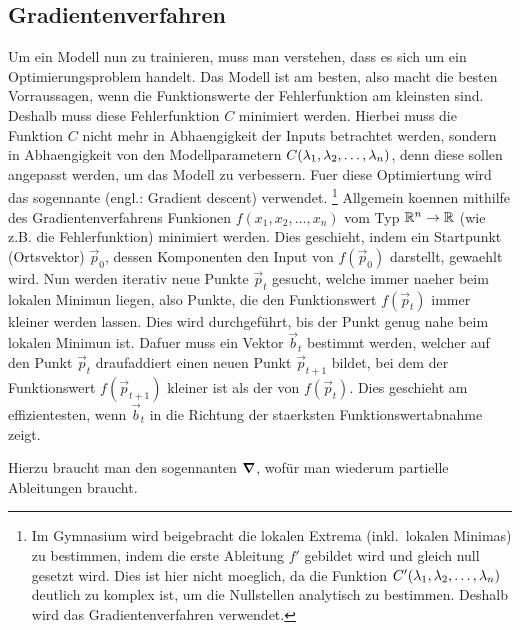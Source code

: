 \subsection{Gradientenverfahren}\label{sec:gradientenverfahren}
Um ein Modell nun zu trainieren, muss man verstehen, dass es sich um ein Optimierungsproblem handelt.
Das Modell ist am besten, also macht die besten Vorraussagen, wenn die
Funktionswerte der Fehlerfunktion am kleinsten sind.
Deshalb muss diese Fehlerfunktion $C$ minimiert werden.
Hierbei muss die Funktion $C$ nicht mehr in Abhaengigkeit der Inputs betrachtet werden, sondern in Abhaengigkeit von den Modellparametern
$C(\lambda_1, \lambda_2, \ldots, \lambda_n)$, denn diese sollen angepasst werden, um das Modell zu verbessern.
Fuer diese Optimiertung wird das sogennante  (engl.: Gradient descent) verwendet.
\footnote{
  Im Gymnasium wird beigebracht die lokalen Extrema (inkl.\ lokalen Minimas) zu bestimmen, indem die erste Ableitung $f'$ gebildet wird und  gleich null gesetzt wird.
  Dies ist hier nicht moeglich, da die Funktion $C'(\lambda_1,\lambda_2, \ldots,
  \lambda_n)$ deutlich zu komplex ist, um die Nullstellen analytisch zu bestimmen. Deshalb wird das Gradientenverfahren verwendet.
}
\para{}
Allgemein koennen mithilfe des Gradientenverfahrens Funkionen $f(x_1, x_2, \ldots, x_n)$ vom Typ $\mathbb{R}^n \to \mathbb{R}$ (wie z.B. die Fehlerfunktion) minimiert werden.
Dies geschieht, indem ein Startpunkt (Ortsvektor) $\vec{p}_0$, dessen
Komponenten den Input von $f(\vec{p}_0)$ darstellt, gewaehlt wird.
Nun werden iterativ neue Punkte $\vec{p}_t$ gesucht, welche immer naeher beim lokalen Minimun liegen, also Punkte, die den Funktionswert $f(\vec{p}_t)$ immer kleiner werden lassen.
Dies wird durchgeführt, bis der Punkt genug nahe beim lokalen Minimun ist.
\para{}
Dafuer muss ein Vektor $\vec{b}_t$ bestimmt werden, welcher auf den Punkt $\vec{p}_t$ draufaddiert einen neuen Punkt $\vec{p}_{t+1}$ bildet,
bei dem der Funktionswert $f(\vec{p}_{t+1})$ kleiner ist als der von $f(\vec{p}_t)$.
Dies geschieht am effizientesten, wenn $\vec{b}_t$ in die Richtung der staerksten Funktionswertabnahme zeigt.

Hierzu braucht man den sogennanten  $\bm{\nabla}$, wofür man wiederum partielle Ableitungen braucht.
\para{}

